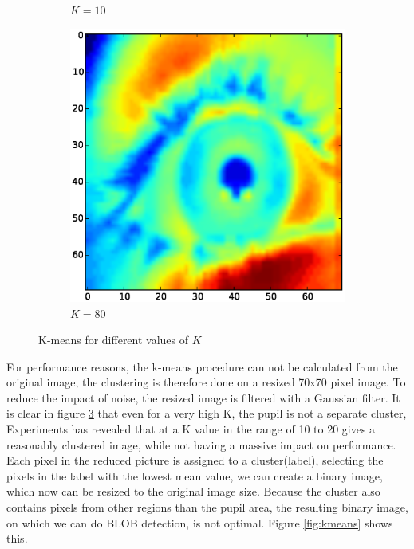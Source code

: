 \documentclass[a4paper,11pt]{article}
\begin{document}
\begin{figure}[ht]
\begin{subfigure}{.33\textwidth}
  \caption{$K=10$}
  \label{fig:kmeans_sub2}
\end{subfigure}
\begin{subfigure}{.33\textwidth}
  \centering
  \includegraphics[width=1\linewidth]{kmean_k80_v70}
  \caption{$K=80$}
  \label{fig:kmeans_sub3}
\end{subfigure}
\caption{K-means for different values of $K$}
\label{fig:kmeans_small}
\end{figure}

For performance reasons, the k-means procedure can not be calculated from the original image, the clustering is therefore done on a resized 70x70 pixel image. To reduce the impact of noise, the resized image is filtered with a Gaussian filter. It is clear in figure \ref{fig:kmeans_small} that even for a very high K, the pupil is not a separate cluster, Experiments has revealed that at a K value in the range of 10 to 20 gives a reasonably clustered image, while not having a massive impact on performance.\\

Each pixel in the reduced picture is assigned to a cluster(label), selecting the pixels in the label with the lowest mean value, we can create a binary image, which now can be resized to the original image size. Because the cluster also contains pixels from other regions than the pupil area, the resulting binary image, on which we can do BLOB detection, is not optimal. Figure \ref{fig:kmeans} shows this.
\end{document}
